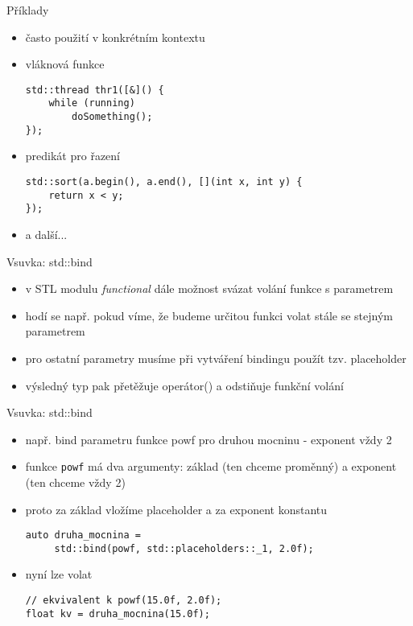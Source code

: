 \documentclass{beamer}
\begin{document}
\begin{xframe}{Příklady}
	\begin{itemize}
		\item často použití v konkrétním kontextu
		\item vláknová funkce
\begin{lstlisting}[basicstyle=\fontsize{8}{9}\selectfont\ttfamily]
std::thread thr1([&]() {
    while (running)
        doSomething();
});
\end{lstlisting}
		\item predikát pro řazení
\begin{lstlisting}[basicstyle=\fontsize{8}{9}\selectfont\ttfamily]
std::sort(a.begin(), a.end(), [](int x, int y) {
    return x < y;
});
\end{lstlisting}
		\item a další...
	\end{itemize}
\end{xframe}

\begin{xframe}{Vsuvka: std::bind}
	\begin{itemize}
		\item v STL modulu \emph{functional} dále možnost svázat volání funkce s parametrem
		\item hodí se např. pokud víme, že budeme určitou funkci volat stále se stejným parametrem
		\item pro ostatní parametry musíme při vytváření bindingu použít tzv. placeholder
		\item výsledný typ pak přetěžuje operátor() a odstiňuje funkční volání
	\end{itemize}
\end{xframe}

\begin{xframe}{Vsuvka: std::bind}
	\begin{itemize}
		\item např. bind parametru funkce powf pro druhou mocninu - exponent vždy 2
		\item funkce \texttt{powf} má dva argumenty: základ (ten chceme proměnný) a exponent (ten chceme vždy 2)
		\item proto za základ vložíme placeholder a za exponent konstantu
\begin{lstlisting}[basicstyle=\fontsize{8}{9}\selectfont\ttfamily]
auto druha_mocnina =
     std::bind(powf, std::placeholders::_1, 2.0f);
\end{lstlisting}
		\item nyní lze volat
\begin{lstlisting}[basicstyle=\fontsize{8}{9}\selectfont\ttfamily]
// ekvivalent k powf(15.0f, 2.0f);
float kv = druha_mocnina(15.0f);
\end{lstlisting}		
	\end{itemize}
\end{xframe}
\end{document}
